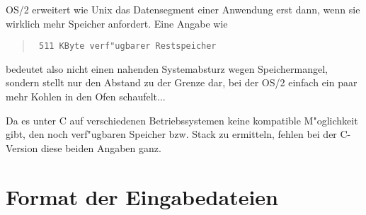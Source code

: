 \documentclass[12pt,a4paper,twoside]{report}
\begin{document}
OS/2  erweitert wie Unix das Datensegment einer
Anwendung erst dann, wenn sie wirklich mehr Speicher anfordert.  Eine
Angabe wie
\begin{quote}{\tt
511 KByte verf"ugbarer Restspeicher
}\end{quote}
bedeutet also nicht einen nahenden Systemabsturz wegen Speichermangel,
sondern stellt nur den Abstand zu der Grenze dar, bei der OS/2 einfach
ein paar mehr Kohlen in den Ofen schaufelt...

Da es unter C   auf verschiedenen Betriebssystemen
keine kompatible M"oglichkeit gibt, den noch verf"ugbaren Speicher bzw.
Stack zu ermitteln, fehlen bei der C-Version diese beiden Angaben ganz.


\section{Format der Eingabedateien}
\label{AttrTypes}
\end{document}
